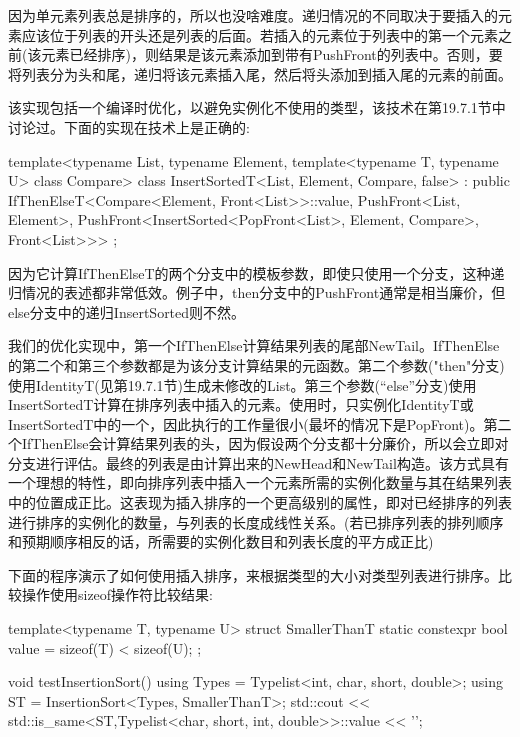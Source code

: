 因为单元素列表总是排序的，所以也没啥难度。递归情况的不同取决于要插入的元素应该位于列表的开头还是列表的后面。若插入的元素位于列表中的第一个元素之前(该元素已经排序)，则结果是该元素添加到带有PushFront的列表中。否则，要将列表分为头和尾，递归将该元素插入尾，然后将头添加到插入尾的元素的前面。

该实现包括一个编译时优化，以避免实例化不使用的类型，该技术在第19.7.1节中讨论过。下面的实现在技术上是正确的:

\begin{cpp}
template<typename List, typename Element,
		template<typename T, typename U> class Compare>
class InsertSortedT<List, Element, Compare, false>
: public IfThenElseT<Compare<Element, Front<List>>::value,
					PushFront<List, Element>,
					PushFront<InsertSorted<PopFront<List>,
											Element, Compare>,
							Front<List>>>
{
};
\end{cpp}

因为它计算IfThenElseT的两个分支中的模板参数，即使只使用一个分支，这种递归情况的表述都非常低效。例子中，then分支中的PushFront通常是相当廉价，但else分支中的递归InsertSorted则不然。

我们的优化实现中，第一个IfThenElse计算结果列表的尾部NewTail。IfThenElse的第二个和第三个参数都是为该分支计算结果的元函数。第二个参数("then"分支)使用IdentityT(见第19.7.1节)生成未修改的List。第三个参数(“else”分支)使用InsertSortedT计算在排序列表中插入的元素。使用时，只实例化IdentityT或InsertSortedT中的一个，因此执行的工作量很小(最坏的情况下是PopFront)。第二个IfThenElse会计算结果列表的头，因为假设两个分支都十分廉价，所以会立即对分支进行评估。最终的列表是由计算出来的NewHead和NewTail构造。该方式具有一个理想的特性，即向排序列表中插入一个元素所需的实例化数量与其在结果列表中的位置成正比。这表现为插入排序的一个更高级别的属性，即对已经排序的列表进行排序的实例化的数量，与列表的长度成线性关系。(若已排序列表的排列顺序和预期顺序相反的话，所需要的实例化数目和列表长度的平方成正比)

下面的程序演示了如何使用插入排序，来根据类型的大小对类型列表进行排序。比较操作使用sizeof操作符比较结果:

\begin{cpp}
template<typename T, typename U>
struct SmallerThanT {
	static constexpr bool value = sizeof(T) < sizeof(U);
};

void testInsertionSort()
{
	using Types = Typelist<int, char, short, double>;
	using ST = InsertionSort<Types, SmallerThanT>;
	std::cout << std::is_same<ST,Typelist<char, short, int, double>>::value
			<< ’\n’;
}
\end{cpp}


























